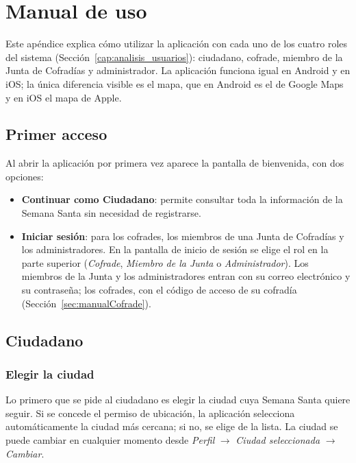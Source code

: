 \chapter{Manual de uso}\label{cap:manual_uso}

Este apéndice explica cómo utilizar la aplicación con cada uno de los cuatro roles del sistema (Sección~\ref{cap:analisis_usuarios}): ciudadano, cofrade, miembro de la Junta de Cofradías y administrador. La aplicación funciona igual en Android y en iOS; la única diferencia visible es el mapa, que en Android es el de Google Maps y en iOS el mapa de Apple.

\section{Primer acceso}

Al abrir la aplicación por primera vez aparece la pantalla de bienvenida, con dos opciones:

\begin{itemize}
    \item \textbf{Continuar como Ciudadano}: permite consultar toda la información de la Semana Santa sin necesidad de registrarse.
    \item \textbf{Iniciar sesión}: para los cofrades, los miembros de una Junta de Cofradías y los administradores. En la pantalla de inicio de sesión se elige el rol en la parte superior (\emph{Cofrade}, \emph{Miembro de la Junta} o \emph{Administrador}). Los miembros de la Junta y los administradores entran con su correo electrónico y su contraseña; los cofrades, con el código de acceso de su cofradía (Sección~\ref{sec:manualCofrade}).
\end{itemize}

\section{Ciudadano}\label{sec:manualCiudadano}

\subsection{Elegir la ciudad}

Lo primero que se pide al ciudadano es elegir la ciudad cuya Semana Santa quiere seguir. Si se concede el permiso de ubicación, la aplicación selecciona automáticamente la ciudad más cercana; si no, se elige de la lista. La ciudad se puede cambiar en cualquier momento desde \emph{Perfil} $\rightarrow$ \emph{Ciudad seleccionada} $\rightarrow$ \emph{Cambiar}.

